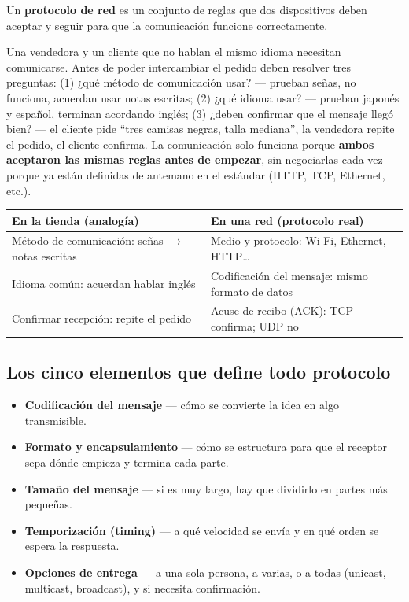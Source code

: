 \documentclass[11pt,a4paper]{article}
\begin{document}
\begin{defbox}
Un \textbf{protocolo de red} es un conjunto de reglas que dos dispositivos deben aceptar y seguir para que la comunicación funcione correctamente.
\end{defbox}

\begin{analogybox}
Una vendedora y un cliente que no hablan el mismo idioma necesitan comunicarse. Antes de poder intercambiar el pedido deben resolver tres preguntas: (1) ¿qué método de comunicación usar? --- prueban señas, no funciona, acuerdan usar notas escritas; (2) ¿qué idioma usar? --- prueban japonés y español, terminan acordando inglés; (3) ¿deben confirmar que el mensaje llegó bien? --- el cliente pide ``tres camisas negras, talla mediana'', la vendedora repite el pedido, el cliente confirma. La comunicación solo funciona porque \textbf{ambos aceptaron las mismas reglas antes de empezar}, sin negociarlas cada vez porque ya están definidas de antemano en el estándar (HTTP, TCP, Ethernet, etc.).
\end{analogybox}

\begin{center}
\small
\begin{tabularx}{\textwidth}{@{}X X@{}}
\toprule
\textbf{En la tienda (analogía)} & \textbf{En una red (protocolo real)} \\
\midrule
Método de comunicación: señas $\to$ notas escritas & Medio y protocolo: Wi-Fi, Ethernet, HTTP\ldots \\
Idioma común: acuerdan hablar inglés & Codificación del mensaje: mismo formato de datos \\
Confirmar recepción: repite el pedido & Acuse de recibo (ACK): TCP confirma; UDP no \\
\bottomrule
\end{tabularx}
\end{center}

\subsection*{Los cinco elementos que define todo protocolo}
\begin{itemize}[leftmargin=1.4em, itemsep=2pt]
\item \textbf{Codificación del mensaje} --- cómo se convierte la idea en algo transmisible.
\item \textbf{Formato y encapsulamiento} --- cómo se estructura para que el receptor sepa dónde empieza y termina cada parte.
\item \textbf{Tamaño del mensaje} --- si es muy largo, hay que dividirlo en partes más pequeñas.
\item \textbf{Temporización (timing)} --- a qué velocidad se envía y en qué orden se espera la respuesta.
\item \textbf{Opciones de entrega} --- a una sola persona, a varias, o a todas (unicast, multicast, broadcast), y si necesita confirmación.
\end{itemize}
\end{document}
